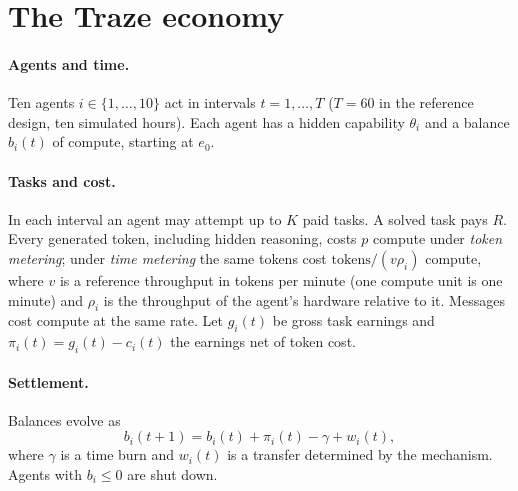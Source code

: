 \documentclass[11pt]{article}
\theoremstyle{plain}
\theoremstyle{remark}
\begin{document}
\section{The Traze economy}
\label{sec:framework}

\paragraph{Agents and time.}
Ten agents $i\in\{1,\dots,10\}$ act in intervals $t=1,\dots,T$ ($T=60$ in the reference design, ten simulated hours). Each agent has a hidden capability $\theta_i$ and a balance $b_i(t)$ of compute, starting at $e_0$.

\paragraph{Tasks and cost.}
In each interval an agent may attempt up to $K$ paid tasks. A solved task pays $R$. Every generated token, including hidden reasoning, costs $p$ compute under \emph{token metering}; under \emph{time metering} the same tokens cost $\mathrm{tokens}/(v\rho_i)$ compute, where $v$ is a reference throughput in tokens per minute (one compute unit is one minute) and $\rho_i$ is the throughput of the agent's hardware relative to it. Messages cost compute at the same rate. Let $g_i(t)$ be gross task earnings and $\pi_i(t)=g_i(t)-c_i(t)$ the earnings net of token cost.

\paragraph{Settlement.}
Balances evolve as
\begin{equation}
  b_i(t+1)=b_i(t)+\pi_i(t)-\gamma+w_i(t),
  \label{eq:ledger}
\end{equation}
where $\gamma$ is a time burn and $w_i(t)$ is a transfer determined by the mechanism. Agents with $b_i\le 0$ are shut down.
\end{document}
